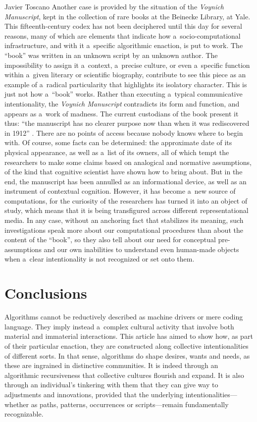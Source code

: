 \begin{artengenv}{Javier Toscano}
Another case is provided by the situation of the \textit{Voynich Manuscript}, kept in the collection of rare books at the Beinecke Library, at Yale. This fifteenth-century codex has not been deciphered until this day for several reasons, many of which are elements that indicate how a~socio-computational infrastructure, and with it a~specific algorithmic enaction, is put to work. The ``book'' was written in an unknown script by an unknown author. The impossibility to assign it a~context, a~precise culture, or even a~specific function within a~given literary or scientific biography, contribute to see this piece as an example of a~radical particularity that highlights its isolatory character. This is just not how a~``book'' works. Rather than executing a~typical communicative intentionality, the \textit{Voynich Manuscript} contradicts its form and function, and appears as a~work of madness. The current custodians of the book present it thus: ``the manuscript has no clearer purpose now than when it was rediscovered in 1912''
\parencite[][]{clemens_voynich_2016}. %
 There are no points of access because nobody knows where to begin with. Of course, some facts can be determined: the approximate date of its physical appearance, as well as a~list of its owners, all of which tempt the researchers to make some claims based on analogical and normative assumptions, of the kind that cognitive scientist have shown how to bring about. But in the end, the manuscript has been annulled as an informational device, as well as an instrument of contextual cognition. However, it has become a~new source of computations, for the curiosity of the researchers has turned it into an object of study, which means that it is being transfigured across different representational media. In any case, without an anchoring fact that stabilizes its meaning, such investigations speak more about our computational procedures than about the content of the ``book'', so they also tell about our need for conceptual pre-assumptions and our own inabilities to understand even human-made objects when a~clear intentionality is not recognized or set onto them.

\section*{Conclusions}
Algorithms cannot be reductively described as machine drivers or mere coding language. They imply instead a~complex cultural activity that involve both material and immaterial interactions. This article has aimed to show how, as part of their particular enaction, they are constructed along collective intentionalities of different sorts. In that sense, algorithms do shape desires, wants and needs, as these are ingrained in distinctive communities. It is indeed through an algorithmic recursiveness that collective cultures flourish and expand. It is also through an individual's tinkering with them that they can give way to adjustments and innovations, provided that the underlying intentionalities---whether as paths, patterns, occurrences or scripts---remain fundamentally recognizable.


\end{artengenv}

